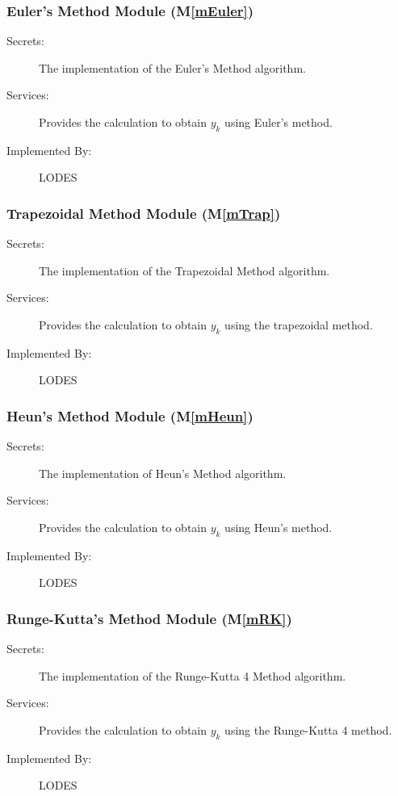 \documentclass[12pt, titlepage]{article}
\newcommand{\mref}[1]{M\ref{#1}}
\begin{document}
\subsubsection{Euler's Method Module (\mref{mEuler})}

\begin{description}
\item[Secrets:]The implementation of the Euler's Method algorithm.
\item[Services:]Provides the calculation to obtain $y_k$ using Euler's method.
\item[Implemented By:] LODES
\end{description}

\subsubsection{Trapezoidal Method Module (\mref{mTrap})}

\begin{description}
\item[Secrets:]The implementation of the Trapezoidal Method algorithm.
\item[Services:]Provides the calculation to obtain $y_k$ using the trapezoidal method.
\item[Implemented By:] LODES
\end{description}

\subsubsection{Heun's Method Module (\mref{mHeun})}

\begin{description}
\item[Secrets:]The implementation of Heun's Method algorithm.
\item[Services:]Provides the calculation to obtain $y_k$ using Heun's method.
\item[Implemented By:] LODES
\end{description}

\subsubsection{Runge-Kutta's Method Module (\mref{mRK})}

\begin{description}
\item[Secrets:]The implementation of the Runge-Kutta 4 Method algorithm.
\item[Services:]Provides the calculation to obtain $y_k$ using the Runge-Kutta 4 method.
\item[Implemented By:] LODES
\end{description}
\end{document}
